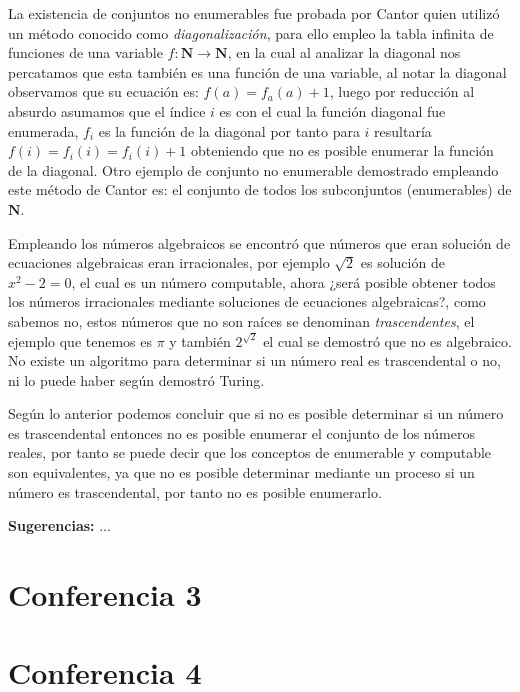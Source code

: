 \documentclass[]{article}
\begin{document}
La existencia de conjuntos no enumerables fue probada por Cantor quien utilizó un método conocido como \textit{diagonalización}, para ello empleo la tabla infinita de funciones de una variable $f: \textbf{N} \rightarrow \textbf{N}$, en la cual al analizar la diagonal nos percatamos que esta también es una función de una variable, al notar la diagonal observamos que su ecuación es: $f(a) = f_a(a) + 1$, luego por reducción al absurdo asumamos que el índice $i$ es con el cual la función diagonal fue enumerada, $f_i$ es la función de la diagonal por tanto para $i$ resultaría $f(i) = f_i(i) = f_i(i) + 1$ obteniendo que no es posible enumerar la función de la diagonal. Otro ejemplo de conjunto no enumerable demostrado empleando este método de Cantor es: el conjunto de todos los subconjuntos (enumerables) de $\textbf{N}$.

Empleando los números algebraicos se encontró que números que eran solución de ecuaciones algebraicas eran irracionales, por ejemplo $\sqrt{2}$ es solución de $x^2 - 2 = 0$, el cual es un número computable, ahora ¿será posible obtener todos los números irracionales mediante soluciones de ecuaciones algebraicas?, como sabemos no, estos números que no son raíces se denominan \textit{trascendentes}, el ejemplo que tenemos es $\pi$ y también $2^{\sqrt{2}}$ el cual se demostró que no es algebraico. No existe un algoritmo para determinar si un número real es trascendental o no, ni lo puede haber según demostró Turing.

Según lo anterior podemos concluir que si no es posible determinar si un número es trascendental entonces no es posible enumerar el conjunto de los números reales, por tanto se puede decir que los conceptos de enumerable y computable son equivalentes, ya que no es posible determinar mediante un proceso si un número es trascendental, por tanto no es posible enumerarlo.

\textbf{Sugerencias:} ...


\section*{Conferencia 3}


\section*{Conferencia 4}
\end{document}
